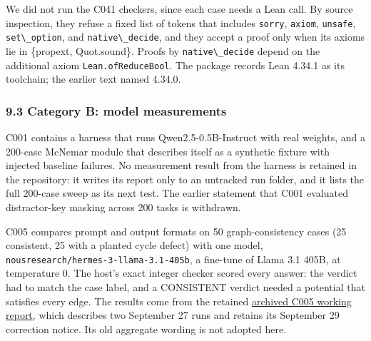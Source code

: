 \documentclass[
  11pt,
]{article}
\newcommand{\passthrough}[1]{#1}
\begin{document}
We did not run the C041 checkers, since each case needs a Lean call. By
source inspection, they refuse a fixed list of tokens that includes
\passthrough{\lstinline!sorry!}, \passthrough{\lstinline!axiom!},
\passthrough{\lstinline!unsafe!}, \passthrough{\lstinline!set\_option!},
and \passthrough{\lstinline!native\_decide!}, and they accept a proof
only when its axioms lie in \{propext, Quot.sound\}. Proofs by
\passthrough{\lstinline!native\_decide!} depend on the additional axiom
\passthrough{\lstinline!Lean.ofReduceBool!}. The package records Lean
4.34.1 as its toolchain; the earlier text named 4.34.0.

\hypertarget{category-b-model-measurements}{%
\subsubsection{9.3 Category B: model
measurements}\label{category-b-model-measurements}}

C001 contains a harness that runs Qwen2.5-0.5B-Instruct with real
weights, and a 200-case McNemar module that describes itself as a
synthetic fixture with injected baseline failures. No measurement result
from the harness is retained in the repository: it writes its report
only to an untracked run folder, and it lists the full 200-case sweep as
its next test. The earlier statement that C001 evaluated distractor-key
masking across 200 tasks is withdrawn.

C005 compares prompt and output formats on 50 graph-consistency cases
(25 consistent, 25 with a planted cycle defect) with one model,
\nolinkurl{nousresearch/hermes-3-llama-3.1-405b}, a fine-tune of Llama
3.1 405B, at temperature 0. The host's exact integer checker scored
every answer: the verdict had to match the case label, and a CONSISTENT
verdict needed a potential that satisfies every edge. The results come
from the retained
\href{https://github.com/dbccpage/the_symbol_game/blob/main/omega_engine_education/documentation/030_pfp_proposal_fidelity_protocol_pfp/papers/omega_engine_symbol_game/008_pfp_mssn_tower_challenges_and_retraction_benchmarks/docs/source_archive/c005_working_report.md}{archived
C005 working report}, which describes two September 27 runs and retains
its September 29 correction notice. Its old aggregate wording is not
adopted here.
\end{document}
